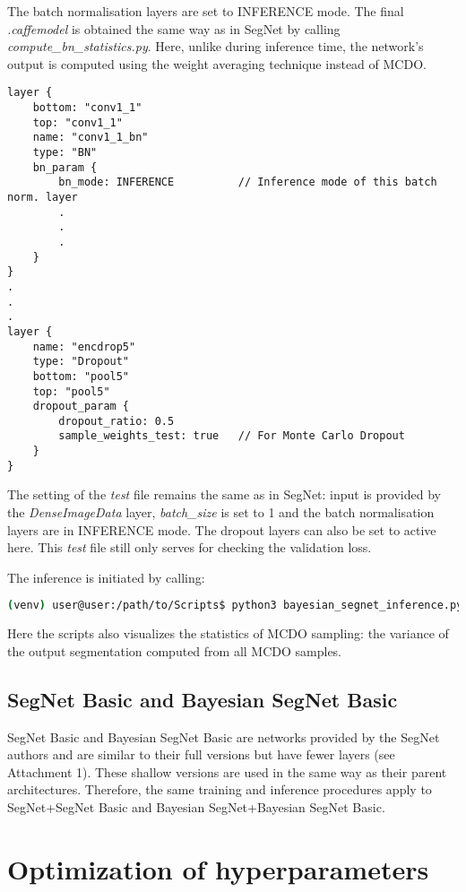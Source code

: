 The batch normalisation layers are set to INFERENCE mode. The final \textit{.caffemodel} is obtained the same way as in SegNet by calling \textit{compute\_bn\_statistics.py}. Here, unlike during inference time, the network's output is computed using the weight averaging technique instead of MCDO.

\begin{lstlisting}[caption={Setting MCDO in \textit{inference.prototxt} \cite{filip_github}},captionpos=b]
layer {
	bottom: "conv1_1"
	top: "conv1_1"
	name: "conv1_1_bn"
	type: "BN"
	bn_param {
		bn_mode: INFERENCE			// Inference mode of this batch norm. layer
		.
		.
		.
	}
}
.
.
.
layer {
	name: "encdrop5"
	type: "Dropout"
	bottom: "pool5"
	top: "pool5"
	dropout_param {
		dropout_ratio: 0.5
		sample_weights_test: true	// For Monte Carlo Dropout
	}
}
\end{lstlisting}

\newpage
The setting of the \textit{test} file remains the same as in SegNet: input is provided by the \textit{DenseImageData} layer, \textit{batch\_size} is set to 1 and the batch normalisation layers are in INFERENCE mode. The dropout layers can also be set to active here. This \textit{test} file still only serves for checking the validation loss.

The inference is initiated by calling:

\begin{lstlisting}[language=bash]
(venv) user@user:/path/to/Scripts$ python3 bayesian_segnet_inference.py /path/to/inference.prototxt /path/to/final_weights.caffemodel /path/to/videofile.avi 
\end{lstlisting}

Here the scripts also visualizes the statistics of MCDO sampling: the variance of the output segmentation computed from all MCDO samples.

\subsection{SegNet Basic and Bayesian SegNet Basic}

SegNet Basic and Bayesian SegNet Basic are networks provided by the SegNet authors and are similar to their full versions but have fewer layers (see Attachment 1). These shallow versions are used in the same way as their parent architectures. Therefore, the same training and inference procedures apply to SegNet+SegNet Basic and Bayesian SegNet+Bayesian SegNet Basic.

\newpage
\section{Optimization of hyperparameters}

